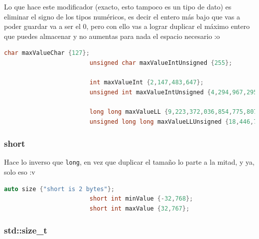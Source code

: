 \documentclass[12pt, fleqn]{report}                             %
\theoremstyle{break}                                            %
\begin{document}
                    Lo que hace este modificador (exacto, esto tampoco es un tipo de dato)
                    es eliminar el signo de los tipos numéricos, es decir el entero más bajo que vas
                    a poder guardar va a ser el 0, pero con ello vas a lograr duplicar
                    el máximo entero que puedes almacenar y no aumentas para nada el espacio necesario :o
                    \begin{lstlisting}[language=C++, gobble=20]
                        char maxValueChar {127};                    
                        unsigned char maxValueIntUnsigned {255};
                        
                        int maxValueInt {2,147,483,647};                    
                        unsigned int maxValueIntUnsigned {4,294,967,295};
                        
                        long long maxValueLL {9,223,372,036,854,775,807};                    
                        unsigned long long maxValueLLUnsigned {18,446,744,073,709,551,615};
                    \end{lstlisting}


                \subsubsection{short}

                    Hace lo inverso que \texttt{long}, en vez que duplicar el tamaño lo parte a la mitad,
                    y ya, solo eso :v

                    \begin{lstlisting}[language=C++, gobble=20]
                        auto size {"short is 2 bytes"};
                        short int minValue {-32,768};
                        short int maxValue {32,767};
                    \end{lstlisting}
                
                \subsubsection{std::size\_t}
\end{document}
